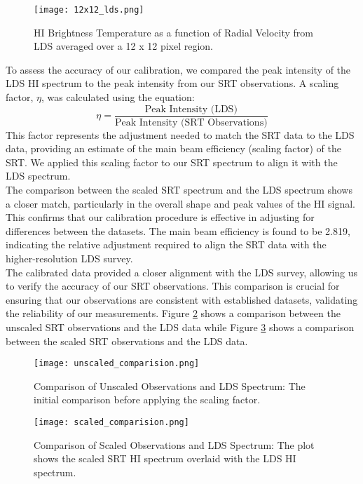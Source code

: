\documentclass[linenumbers,twocolumn]{aastex631}
\begin{document}
\begin{figure}[h]
    \centering
    \texttt{[image: 12x12\_lds.png]}
    \caption{HI Brightness Temperature as a function of Radial Velocity from LDS averaged over a 12 x 12 pixel region.}
    \label{12x12}
\end{figure}

To assess the accuracy of our calibration, we compared the peak intensity of the LDS HI spectrum to the peak intensity from our SRT observations. A scaling factor, \(\eta\), was calculated using the equation:
\[
\eta = \frac{\text{Peak Intensity (LDS)}}{\text{Peak Intensity (SRT Observations)}}
\]
This factor represents the adjustment needed to match the SRT data to the LDS data, providing an estimate of the main beam efficiency (scaling factor) of the SRT. We applied this scaling factor to our SRT spectrum to align it with the LDS spectrum. \\

The comparison between the scaled SRT spectrum and the LDS spectrum shows a closer match, particularly in the overall shape and peak values of the HI signal. This confirms that our calibration procedure is effective in adjusting for differences between the datasets. The main beam efficiency is found to be 2.819, indicating the relative adjustment required to align the SRT data with the higher-resolution LDS survey. \\

The calibrated data provided a closer alignment with the LDS survey, allowing us to verify the accuracy of our SRT observations. This comparison is crucial for ensuring that our observations are consistent with established datasets, validating the reliability of our measurements. Figure \ref{unscaled} shows a comparison between the unscaled SRT observations and the LDS data while Figure \ref{scaled} shows a comparison between the scaled SRT observations and the LDS data.

\begin{figure}[h]
    \centering
    \texttt{[image: unscaled\_comparision.png]}
    \caption{Comparison of Unscaled Observations and LDS Spectrum: The initial comparison before applying the scaling factor.}
    \label{unscaled}
\end{figure}

\begin{figure}[h]
    \centering
    \texttt{[image: scaled\_comparision.png]}
    \caption{Comparison of Scaled Observations and LDS Spectrum: The plot shows the scaled SRT HI spectrum overlaid with the LDS HI spectrum.}
    \label{scaled}
\end{figure}
\end{document}
